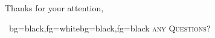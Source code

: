 \begin{frame}[plain]
    \centering
    Thanks for your attention,\\
    \vskip 1cm
    \begin{center}\hspace*{-2.5cm}\begin{minipage}{1.01\textwidth}\begin{varblockCol}
        {~}{bg=black,fg=white}{bg=black,fg=black}
        \hfill \textsc{any Questions?}~~
    \end{varblockCol}\end{minipage}\end{center}
\end{frame}
